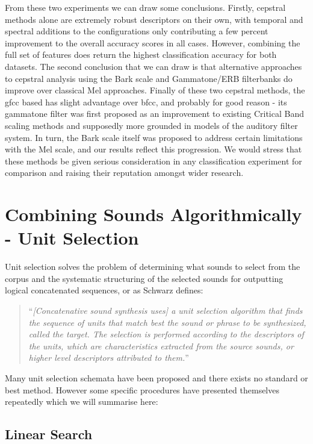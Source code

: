 {{{{{{{From these two experiments we can draw some conclusions. Firstly, cepstral methods alone are extremely robust descriptors on their own, with temporal and spectral additions to the configurations only contributing a few percent improvement to the overall accuracy scores in all cases. However, combining the full set of features does return the highest classification accuracy for both datasets. The second conclusion that we can draw is that alternative approaches to cepstral analysis using the Bark scale and Gammatone/ERB filterbanks do improve over classical Mel approaches.  Finally of these two cepstral methods, the \acrshort{gfcc} based has slight advantage over \acrshort{bfcc}, and probably for good reason - its gammatone filter was first proposed as an improvement to existing Critical Band scaling methods and supposedly more grounded in models of the auditory filter system. In turn, the Bark scale itself was proposed to address certain limitations with the Mel scale, and our results reflect this progression. We would stress that these methods be given serious consideration in any classification experiment for comparison and raising their reputation amongst wider research.

\section{Combining Sounds Algorithmically - Unit Selection}

Unit selection solves the problem of determining what sounds to select from the corpus and the systematic structuring of the selected sounds for outputting logical concatenated sequences, or as Schwarz defines:

\blockcquote[]{Schwarz2006b}{``\textit{[Concatenative sound synthesis uses] a unit selection algorithm that finds the sequence of units that match best the sound or phrase to be synthesized, called the target. The selection is performed according to the descriptors of the units, which are characteristics extracted from the source sounds, or higher level descriptors attributed to them.}''} 

 Many unit selection schemata have been proposed and there exists no standard or best method. However some specific procedures have presented themselves repeatedly which we will summarise here:

\subsection{Linear Search}

}}}}}}}
